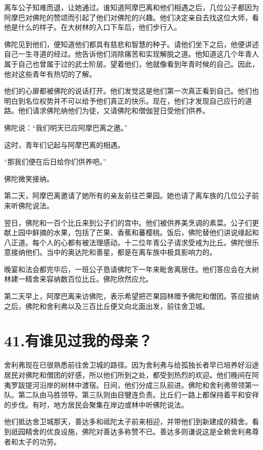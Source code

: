 \documentclass[12pt,twoside,openany]{book}
\begin{document}
离车公子知难而退，让她通过。谁知道阿摩巴离和他们相遇之后，几位公子都因为阿摩巴对佛陀的赞颂而引起了他们对佛陀的兴趣。他们决定亲自去找这位大师，看他是什么的样子。在大树林的入口下车后，他们步行入。

佛陀见到他们，便知道他们都具有慈悲和智慧的种子。请他们坐下之后，他便讲述自己一生寻道的经过。他告诉他们消除痛苦和实现解脱之道。他知道这几个年青人属于自己也曾属于过的武士阶层。望着他们，他就像看到年青时候的自己。因此，他对这些青年有热切的了解。

他们的心扉都被佛陀的说话打开。他们发觉这是他们第一次真正看到自己。他们也明白到名位权势并不可以给予他们真正的快乐。现在，他们才发现自己应行的道路。他们请求佛陀纳他们为徒，又请佛陀和僧伽翌日受他们供养。

佛陀说：“我们明天已应阿摩巴离之邀。”

这时，青年们记起与阿摩巴离的相遇。

“那我们便在后日给你们供养吧。”

佛陀微笑接纳。

第二天，阿摩巴离邀请了她所有的亲友前往芒果园。她也请了离车族的几位公子前来听佛陀说法。

翌日，佛陀和一百个比丘来到公子们的宫中。他们被供养美烹调的素菜。公子们更献上园中鲜摘的水果，包括了芒果、香蕉和蕃樱桃。饭后，佛陀替他们讲说缘起和八正道。每个人的心都有被法理感动。十二位年青公子请求受戒为比丘。佛陀很乐意接纳他们。当中的奥达陀和善星，都是在离车族中极具影响力的。

晚宴和法会都完毕后，一班公子恳请佛陀下一年来毗舍离居住。他们答应会在大树林建一精舍来容纳数百位比丘。佛陀欣然应允。

第二天早上，阿摩巴离来访佛陀，表示希望把芒果园林赠予佛陀和僧团。答应接纳之后，佛陀和舍利弗以及三百比丘便又向北面出发，前往舍卫城。


\chapter{41.有谁见过我的母亲？}\label{ch41}

舍利弗现在已很熟悉前往舍卫城的路径。因为舍利弗与给孤独长者早已培养好沿途居民对佛陀和僧团的好感，所以他们所到之处，都受到热烈的欢迎。他们晚间在阿夷罗跋提河沿岸的树林中渡宿。日间，他们分成三队前进。佛陀和舍利弗带领第一队。第二队由马胜领导。第三队则由目犍连负责。比丘们一路上都保持着平和安祥的步伐。有时，地方居民会聚集在岸边或林中听佛陀说法。

他们抵达舍卫城那天，善达多和祗陀太子前来相迎，并带他们到新建成的精舍。看到祇园精舍的优良设施，佛陀对善达多称赞不已。善达多则谦说这是全赖舍利弗尊者和太子的功劳。
\end{document}
